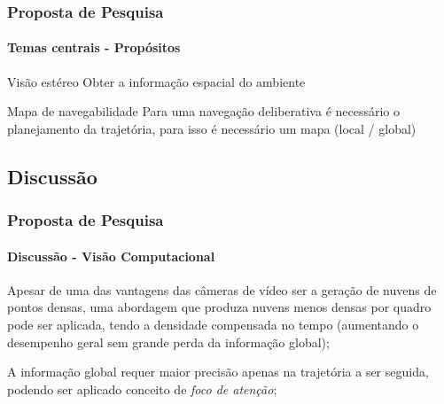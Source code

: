 \documentclass[brazil]{beamer}
\begin{document}


\begin{frame}
\frametitle{Proposta de Pesquisa}
\framesubtitle{Temas centrais - Propósitos}

\begin{block}{Visão estéreo}
Obter a informação espacial do ambiente
\end{block}

\begin{block}{Mapa de navegabilidade}
Para uma navegação deliberativa é necessário o planejamento da trajetória, para isso é necessário 
um mapa (local / global)
\end{block}

\end{frame}


\subsection[Discussão]{Discussão}

\begin{frame}
\frametitle{Proposta de Pesquisa}
\framesubtitle{Discussão - Visão Computacional}
\begin{block}{}
Apesar de uma das vantagens das câmeras de vídeo ser a geração de nuvens de pontos densas, 
uma abordagem que produza nuvens menos densas por quadro pode ser aplicada, tendo a densidade 
compensada no tempo (aumentando o desempenho geral sem grande perda da informação global);
\end{block}
\begin{block}{}
A informação global requer maior precisão apenas na trajetória a ser seguida, 
podendo ser aplicado conceito de \textit{foco de atenção};
\end{block}
\end{frame}
\end{document}
